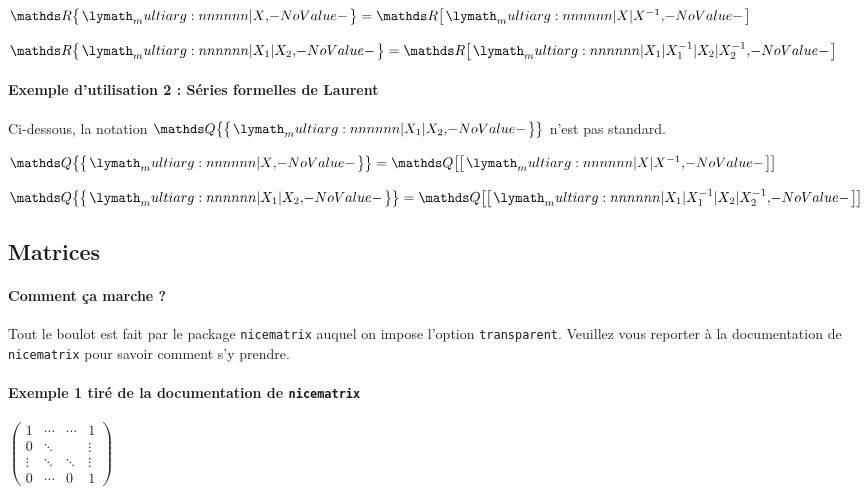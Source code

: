 \documentclass[12pt,a4paper]{article}
\theoremstyle{definition}
\begin{document}
\begin{latexex}
$\setpolylaurent{\RR}{X}
 = \setpoly{\RR}{X | X^{-1}}$

$\setpolylaurent{\RR}{X_1 | X_2}
 = \setpoly{\RR}%
           {X_1 | X_1^{-1} %
            | X_2 | X_2^{-1}}$
\end{latexex}




\paragraph{Exemple d'utilisation 2 : Séries formelles de Laurent}

Ci-dessous, la notation $\setserielaurent{\QQ}{X_1 | X_2}$ n'est pas standard.

\begin{latexex}
$\setserielaurent{\QQ}{X}
 = \setserie{\QQ}{X | X^{-1}}$

$\setserielaurent{\QQ}{X_1 | X_2} 
= \setserie{\QQ}%
           {X_1 | X_1^{-1} %
           | X_2 | X_2^{-1}}$
\end{latexex}



\subsection{Matrices}

\paragraph{Comment ça marche ?}

Tout le boulot est fait par le package \verb+nicematrix+ auquel on impose l'option \verb+transparent+. Veuillez vous reporter à la documentation de \verb+nicematrix+ pour savoir comment s'y prendre.




\paragraph{Exemple 1 tiré de la documentation de \texttt{nicematrix}}

\begin{latexex}
$\begin{pmatrix}
    1      & \cdots & \cdots & 1      \\
    0      & \ddots &        & \vdots \\
    \vdots & \ddots & \ddots & \vdots \\
    0      & \cdots & 0      & 1
\end{pmatrix}$
\end{latexex}
\end{document}
